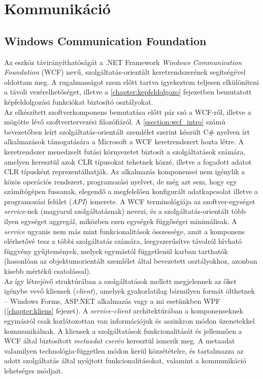 \chapter{Kommunikáció} \label{chapter:kommunikacio}
\section{Windows Communication Foundation}
Az eszköz távirányíthatóságát a .NET Framework \emph{Windows Communication Foundation} (WCF) nevű, szolgáltatás-orientált keretrendszerének segítségével oldottam meg. A rugalmasságot szem előtt tartva igyekeztem teljesen elkülöníteni a távoli vezérelhetőséget, illetve a \ref{chapter:kepfeldolgozo} fejezetben bemutatott képfeldolgozási funkciókat biztosító osztályokat.\\

Az elkészített szoftverkomponens bemutatása előtt pár szó a WCF-ről, illetve a mögötte lévő szoftvertervezési filozófiáról. A \ref{ssection:wcf_intro} számú bevezetőben leírt szolgáltatás-orientált szemlélet szerint készült C\# nyelven írt alkalmazások támogatására a Microsoft a WCF keretrendszert hozta létre. A keretrendszer menedzselt futási környezetet biztosít a szolgáltatások számára, amelyen keresztül azok CLR típusokat tehetnek közzé, illetve a fogadott adatot CLR típusként reprezentálhatják. Az alkalmazás komponensei nem igénylik a közös operációs rendszert, programozási nyelvet, de még azt sem, hogy egy számítógépen fussanak, elegendő a megfelelően konfigurált adatkapcsolat illetve a programozási felület (\emph{API}) ismerete. A WCF terminológiája az szoftver-egységet \emph{service}-nek (magyarul szolgáltatásnak) nevezi, és a szolgáltatás-orientált több ilyen egységet aggregál, miközben ezen egységek függőségei minimálisak. A \emph{service} ugyanis nem más mint funkcionalitások összessége, amit a komponens elérhetővé tesz a többi szolgáltatás számára, leegyszerűsítve távolról hívható függvény gyűjtemények, melyek egymástól függetlenül karban tarthatók (hasonlóan az objektumorientált szemlélet által bevezetett osztályokhoz, azonban kisebb mértékű csatolással).\\

Az így létrejövő struktúrában a szolgáltatások mellett megjelennek az őket igénybe vevő kliensek (\emph{client}), amelyek gyakorlatilag bármilyen formát ölthetnek --  Windows Forms, ASP.NET alkalmazás vagy a mi esetünkben WPF (\ref{chapter:kliens} fejezet). A \emph{service-client} architektúrában a komponenseknek egymásról csak korlátozottan van információjuk és aszinkron módon üzenetekkel kommunikálnak. A kliensek a szolgáltatások funkcionalitását és jellemzően a WCF által biztosított \emph{metaadat cserén} keresztül ismerik meg. A metaadat valamilyen technológia-független módon kerül közzétételre, és tartalmazza az adott szolgáltatás által nyújtott funkcionalitásokat, valamint a kommunikáció lehetséges módjait. \\


